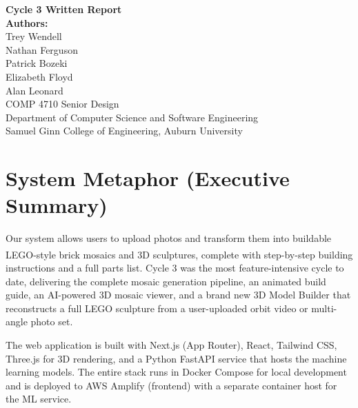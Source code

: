 \documentclass[12pt]{article}
\begin{document}
\begin{titlepage}
    \centering
    \vspace*{2cm}
    {\LARGE \textbf{Cycle 3 Written Report}\\[1em]}
    {\large \textbf{Authors:}\\[0.5em]}
    {\large
        Trey Wendell\\
        Nathan Ferguson\\
        Patrick Bozeki\\
        Elizabeth Floyd\\
        Alan Leonard\\[1.5em]
    }
    {\large COMP 4710 Senior Design\\[0.5em]}
    {\large Department of Computer Science and Software Engineering\\
    Samuel Ginn College of Engineering, Auburn University\\}
    \vfill
\end{titlepage}

\tableofcontents
\newpage

\section{System Metaphor (Executive Summary)}

Our system allows users to upload photos and transform them into buildable
LEGO\textsuperscript{\textregistered}-style brick mosaics and 3D sculptures,
complete with step-by-step building instructions and a full parts list.
Cycle 3 was the most feature-intensive cycle to date, delivering the complete
mosaic generation pipeline, an animated build guide, an AI-powered 3D mosaic
viewer, and a brand new 3D Model Builder that reconstructs a full LEGO sculpture
from a user-uploaded orbit video or multi-angle photo set.

The web application is built with Next.js (App Router), React, Tailwind CSS,
Three.js for 3D rendering, and a Python FastAPI service that hosts the machine
learning models. The entire stack runs in Docker Compose for local development
and is deployed to AWS Amplify (frontend) with a separate container host for the
ML service.

\end{document}

